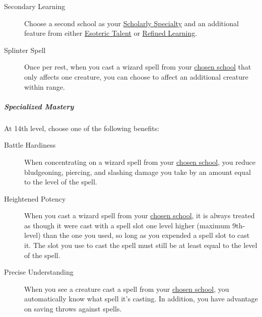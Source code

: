 \begin{description}
\item[Secondary Learning]
Choose a second school as your
\hyperref[wizard-subclass-arcanist-scholarly-speciality]{Scholarly
Specialty} and an additional feature from either
\hyperref[wizard-subclass-arcanist-esoteric-talent]{Esoteric Talent} or
\hyperref[wizard-subclass-arcanist-refined-learning]{Refined Learning}.
\end{description}

\begin{description}
\item[Splinter Spell]
Once per rest, when you cast a wizard spell from your
\hyperref[wizard-subclass-arcanist-scholarly-speciality]{chosen school}
that only affects one creature, you can choose to affect an additional
creature within range.
\end{description}

\subparagraph{Specialized
Mastery}\label{wizard-subclass-arcanist-specialized-mastery}

At 14th level, choose one of the following benefits:

\begin{description}
\item[Battle Hardiness]
When concentrating on a wizard spell from your
\hyperref[wizard-subclass-arcanist-scholarly-speciality]{chosen school},
you reduce bludgeoning, piercing, and slashing damage you take by an
amount equal to the level of the spell.
\end{description}

\begin{description}
\item[Heightened Potency]
When you cast a wizard spell from your
\hyperref[wizard-subclass-arcanist-scholarly-speciality]{chosen school},
it is always treated as though it were cast with a spell slot one level
higher (maximum 9th-level) than the one you used, so long as you
expended a spell slot to cast it. The slot you use to cast the spell
must still be at least equal to the level of the spell.
\end{description}

\begin{description}
\item[Precise Understanding]
When you see a creature cast a spell from your
\hyperref[wizard-subclass-arcanist-scholarly-speciality]{chosen school},
you automatically know what spell it's casting. In addition, you have
advantage on saving throws against spells.
\end{description}

